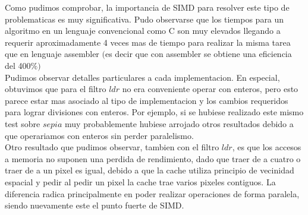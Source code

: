 Como pudimos comprobar, la importancia de SIMD para resolver este tipo de problematicas es muy significativa. 
Pudo observarse que los tiempos para un algoritmo en un lenguaje convencional como C son muy elevados llegando a requerir aproximadamente 4 veces mas de tiempo para realizar la misma tarea que en lenguaje assembler $($es decir que con assembler se obtiene una eficiencia del 400$ \% )$\\

Pudimos observar detalles particulares a cada implementacion. En especial, obtuvimos que para el filtro $ldr$ no era conveniente operar con enteros, pero esto parece estar mas asociado al tipo de implementacion y los cambios requeridos para lograr divisiones con enteros. Por ejemplo, si se hubiese realizado este mismo test sobre $sepia$ muy probablemente hubiese arrojado otros resultados debido a que operariamos con enteros sin perder paralelismo.\\

Otro resultado que pudimos observar, tambien con el filtro $ldr$, es que los accesos a memoria no suponen una perdida de rendimiento, dado que traer de a cuatro o traer de a un pixel es igual, debido a que la cache utiliza principio de vecinidad espacial y pedir al pedir un pixel la cache trae varios pixeles contiguos. La diferencia radica principalmente en poder realizar operaciones de forma paralela, siendo nuevamente este el punto fuerte de SIMD. \\


